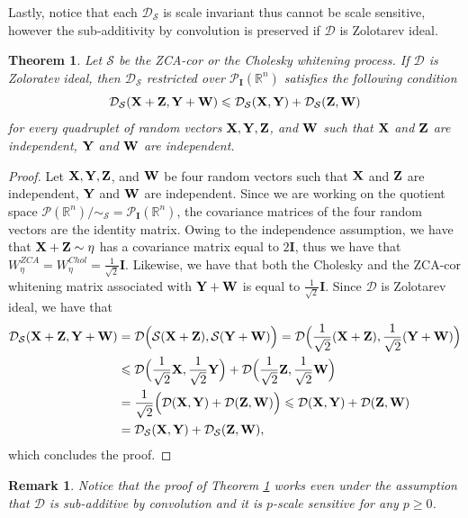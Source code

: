 \documentclass{article}
\renewcommand{\le}{\leqslant}
\renewcommand{\ge}{\geqslant}
\def\DDSS{\mathcal{D}_\mathcal{S}}
\def \Id{\mathbf{I}}
\def\bZ{{\bf Z}}
\def\bX{{\bf X}}
\def\bY{{\bf Y}}
\def\bW{{\bf W}}
\def \PP{\mathcal{P}}
\def \erre{\mathbb{R}}
\newtheorem{theorem}{Theorem}
\newtheorem{remark}{Remark}
\newtheorem{proof}{Proof}
\begin{document}
% 
Lastly, notice that each $\DDSS$ is scale invariant thus cannot be scale sensitive, however the sub-additivity by convolution is preserved if $\mathcal{D}$ is Zolotarev ideal.

\begin{theorem}
    \label{thm:ZI}
    Let $\mathcal{S}$ be the ZCA-cor or the Cholesky whitening process.
    If $\mathcal{D}$ is Zoloratev ideal, then $\DDSS$ restricted over $\PP_{\Id}(\erre^n)$ satisfies the following condition
    \begin{equation}
        \label{eq:simple_subadd}
        \DDSS(\bX+\bZ,\bY+\bW)\le \DDSS(\bX,\bY) + \DDSS(\bZ,\bW)
    \end{equation}
    for every quadruplet of random vectors $\bX,\bY,\bZ$, and $\bW$ such that $\bX$ and $\bZ$ are independent, $\bY$ and $\bW$ are independent.
\end{theorem}


\begin{proof}
% 
    Let $\bX,\bY,\bZ$, and $\bW$ be four random vectors such that $\bX$ and $\bZ$ are independent, $\bY$ and $\bW$ are independent.
    Since we are working on the quotient space $\PP(\erre^n)/\sim_\mathcal{S}=\PP_{\Id}(\erre^n)$, the covariance matrices of the four random vectors are the identity matrix.
    Owing to the independence assumption, we have that $\bX+\bZ\sim\eta$ has a covariance matrix equal to $2\Id$, thus we have that $W^{ZCA}_\eta=W^{Chol}_\eta=\frac{1}{\sqrt{2}}\Id$.
    Likewise, we have that both the Cholesky and the ZCA-cor whitening matrix associated with $\bY+\bW$ is equal to $\frac{1}{\sqrt{2}}\Id$.
   Since $\mathcal{D}$ is Zolotarev ideal, we have that
    \begin{align*}
        \DDSS(\bX+\bZ,\bY+\bW) &= \mathcal{D}\Big(\mathcal{S}(\bX+\bZ),\mathcal{S}(\bY+\bW)\Big) = \mathcal{D}\Big(\frac{1}{\sqrt{2}}(\bX+\bZ),\frac{1}{\sqrt{2}}(\bY+\bW)\Big)\\
        &\le \mathcal{D}\Big(\frac{1}{\sqrt{2}}\bX,\frac{1}{\sqrt{2}}\bY\Big) + \mathcal{D}\Big(\frac{1}{\sqrt{2}}\bZ,\frac{1}{\sqrt{2}}\bW\Big)\\
        &=\frac{1}{\sqrt{2}}\Big(\mathcal{D}(\bX,\bY) + \mathcal{D}(\bZ,\bW)\Big)\le \mathcal{D}(\bX,\bY) + \mathcal{D}(\bZ,\bW)\\
        &=\DDSS(\bX,\bY)+\DDSS(\bZ,\bW),
    \end{align*}
    which concludes the proof.
\end{proof}


\begin{remark}
    Notice that the proof of Theorem \ref{thm:ZI} works even under the assumption that $\mathcal{D}$ is sub-additive by convolution and it is $p$-scale sensitive for any $p\ge 0$.
\end{remark}
\end{document}
